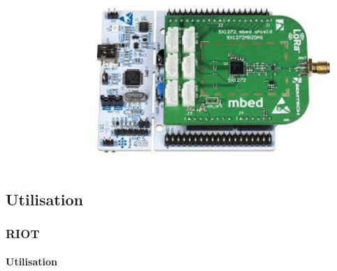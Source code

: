 \begin{frame}
\begin{columns}
\begin{column}{0.35\textwidth}
  \end{column}
  \begin{column}{0.3\textwidth}
  \includegraphics[width=0.9\textwidth]{presentation.tex/fig/loramote3.jpg}
  \end{column}
\end{columns}
  
\end{frame}

\subsection{Utilisation}

\begin{frame}[t]
  \frametitle{RIOT}
  \framesubtitle{Utilisation}
\end{frame}

